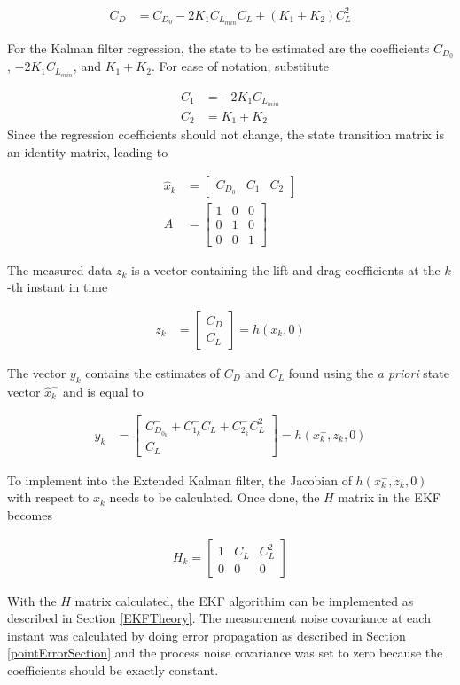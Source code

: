 \begin{align}
C_D &= C_{D_0}-2K_1C_{L_{min}}C_L+(K_1+K_2)C^2_L
\end{align}

For the Kalman filter regression, the state to be estimated are the coefficients $C_{D_0}$, $-2K_1C_{L_{min}}$, and $K_1+K_2$. For ease of notation, substitute

\begin{align}
C_1 &= -2K_1C_{L_{min}}\\
C_2 &= K_1+K_2
\end{align}Since the regression coefficients should not change, the state transition matrix is an identity matrix, leading to

\begin{align}
\hat{x}_k &= \begin{bmatrix}
C_{D_0} & C_1 & C_2
\end{bmatrix}\\
A &= \begin{bmatrix}
1&0&0\\0&1&0\\0&0&1
\end{bmatrix}
\end{align}


The measured data $z_k$ is a vector containing the lift and drag coefficients at the $k$-th instant in time

\begin{align}
z_k &= \begin{bmatrix}
C_D\\C_L
\end{bmatrix} = h(x_{k},0)
\end{align}


The vector $y_k$ contains the estimates of $C_D$ and $C_L$ found using the \textit{a priori} state vector $\hat{x}^-_k$ and is equal to

\begin{align}
y_k &= \begin{bmatrix} C^-_{D_{0_k}}+C^-_{1_k}C_L+C^-_{2_k}C^2_L \\ C_L \end{bmatrix} =h(x^-_k,z_k,0)
\end{align}


To implement into the Extended Kalman filter, the Jacobian of $h(x^-_k,z_k,0)$ with respect to $x_k$ needs to be calculated. Once done, the $H$ matrix in the EKF becomes

\begin{align}
H_k = \begin{bmatrix}
1 & C_L & C^2_L\\0&0&0
\end{bmatrix}
\end{align}


With the $H$ matrix calculated, the EKF algorithim can be implemented as described in Section \ref{EKFTheory}. The measurement noise covariance at each instant was calculated by doing error propagation as described in Section \ref{pointErrorSection} and the process noise covariance was set to zero because the coefficients should be exactly constant.
